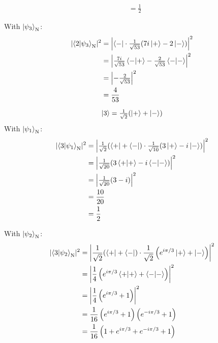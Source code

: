 \documentclass[11pt]{article}
\newcommand\abs[1]{\lvert#1\rvert}
\newcommand\Abs[1]{\left\lvert#1\right\rvert}
\begin{document}
\begin{enumerate}[label=\textbf{\arabic*.}, start=2]
{\begin{enumerate}[label=\textbf{(\alph*)}]
{\begin{align*}
                        &=\frac{1}{2}
                    \end{align*}
                    \par
                    With \(\ket{\psi_3}_\mathrm{N}\):
                    \begin{align*}
                        \abs{\braket{2|\psi_3}_\mathrm{N}}^2&=\Abs{\bra{-}\cdot\tfrac{1}{\sqrt{53}}(7i\ket{+}-2\ket{-})}^2 \\
                        &=\Abs{\tfrac{7i}{\sqrt{53}}\braket{-|+}-\tfrac{2}{\sqrt{53}}\braket{-|-}}^2 \\
                        &=\Abs{-\tfrac{2}{\sqrt{53}}}^2 \\
                        &=\frac{4}{53}
                    \end{align*}
                    \par
                    {\boldmath \[\ket{3}=\tfrac{1}{\sqrt 2}(\ket{+}+\ket{-})\]}
                    With \(\ket{\psi_1}_\mathrm{N}\):
                    \begin{align*}
                        \abs{\braket{3|\psi_1}_\mathrm{N}}^2&=\Abs{\tfrac{1}{\sqrt 2}(\bra{+}+\bra{-})\cdot\tfrac{1}{\sqrt{10}}(3\ket{+}-i\ket{-})}^2 \\
                        &=\Abs{\tfrac{1}{\sqrt{20}}(3\braket{+|+}-i\braket{-|-})}^2 \\
                        &=\Abs{\tfrac{1}{\sqrt{20}}(3-i)}^2 \\
                        &=\frac{10}{20} \\
                        &=\frac 1 2
                    \end{align*}
                    \par
                    With \(\ket{\psi_2}_\mathrm{N}\):
                    \begin{align*}
                        \abs{\braket{3|\psi_2}_\mathrm{N}}^2&=\Abs{\frac{1}{\sqrt 2}(\bra{+}+\bra{-})\cdot\frac{1}{\sqrt 2}\left(e^{i\pi/3}\ket{+}+\ket{-}\right)}^2 \\
                        &=\Abs{\frac 1 4 \left(e^{i\pi/3}\braket{+|+}+\braket{-|-}\right)}^2 \\
                        &=\Abs{\frac 1 4 \left(e^{i\pi/3}+1\right)}^2 \\
                        &=\frac{1}{16}\left(e^{i\pi/3}+1\right)\left(e^{-i\pi/3}+1\right) \\
                        &=\frac{1}{16}\left(1+e^{i\pi/3}+e^{-i\pi/3}+1\right) \\

\end{align*}}
\end{enumerate}}
\end{enumerate}
\end{document}
